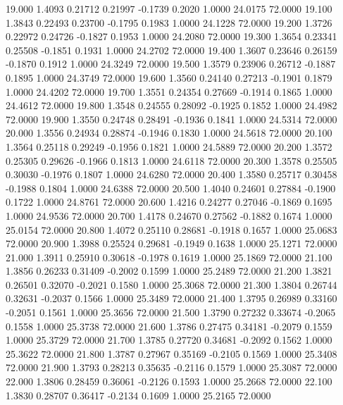   19.000   1.4093   0.21712   0.21997  -0.1739   0.2020   1.0000  24.0175  72.0000
  19.100   1.3843   0.22493   0.23700  -0.1795   0.1983   1.0000  24.1228  72.0000
  19.200   1.3726   0.22972   0.24726  -0.1827   0.1953   1.0000  24.2080  72.0000
  19.300   1.3654   0.23341   0.25508  -0.1851   0.1931   1.0000  24.2702  72.0000
  19.400   1.3607   0.23646   0.26159  -0.1870   0.1912   1.0000  24.3249  72.0000
  19.500   1.3579   0.23906   0.26712  -0.1887   0.1895   1.0000  24.3749  72.0000
  19.600   1.3560   0.24140   0.27213  -0.1901   0.1879   1.0000  24.4202  72.0000
  19.700   1.3551   0.24354   0.27669  -0.1914   0.1865   1.0000  24.4612  72.0000
  19.800   1.3548   0.24555   0.28092  -0.1925   0.1852   1.0000  24.4982  72.0000
  19.900   1.3550   0.24748   0.28491  -0.1936   0.1841   1.0000  24.5314  72.0000
  20.000   1.3556   0.24934   0.28874  -0.1946   0.1830   1.0000  24.5618  72.0000
  20.100   1.3564   0.25118   0.29249  -0.1956   0.1821   1.0000  24.5889  72.0000
  20.200   1.3572   0.25305   0.29626  -0.1966   0.1813   1.0000  24.6118  72.0000
  20.300   1.3578   0.25505   0.30030  -0.1976   0.1807   1.0000  24.6280  72.0000
  20.400   1.3580   0.25717   0.30458  -0.1988   0.1804   1.0000  24.6388  72.0000
  20.500   1.4040   0.24601   0.27884  -0.1900   0.1722   1.0000  24.8761  72.0000
  20.600   1.4216   0.24277   0.27046  -0.1869   0.1695   1.0000  24.9536  72.0000
  20.700   1.4178   0.24670   0.27562  -0.1882   0.1674   1.0000  25.0154  72.0000
  20.800   1.4072   0.25110   0.28681  -0.1918   0.1657   1.0000  25.0683  72.0000
  20.900   1.3988   0.25524   0.29681  -0.1949   0.1638   1.0000  25.1271  72.0000
  21.000   1.3911   0.25910   0.30618  -0.1978   0.1619   1.0000  25.1869  72.0000
  21.100   1.3856   0.26233   0.31409  -0.2002   0.1599   1.0000  25.2489  72.0000
  21.200   1.3821   0.26501   0.32070  -0.2021   0.1580   1.0000  25.3068  72.0000
  21.300   1.3804   0.26744   0.32631  -0.2037   0.1566   1.0000  25.3489  72.0000
  21.400   1.3795   0.26989   0.33160  -0.2051   0.1561   1.0000  25.3656  72.0000
  21.500   1.3790   0.27232   0.33674  -0.2065   0.1558   1.0000  25.3738  72.0000
  21.600   1.3786   0.27475   0.34181  -0.2079   0.1559   1.0000  25.3729  72.0000
  21.700   1.3785   0.27720   0.34681  -0.2092   0.1562   1.0000  25.3622  72.0000
  21.800   1.3787   0.27967   0.35169  -0.2105   0.1569   1.0000  25.3408  72.0000
  21.900   1.3793   0.28213   0.35635  -0.2116   0.1579   1.0000  25.3087  72.0000
  22.000   1.3806   0.28459   0.36061  -0.2126   0.1593   1.0000  25.2668  72.0000
  22.100   1.3830   0.28707   0.36417  -0.2134   0.1609   1.0000  25.2165  72.0000
